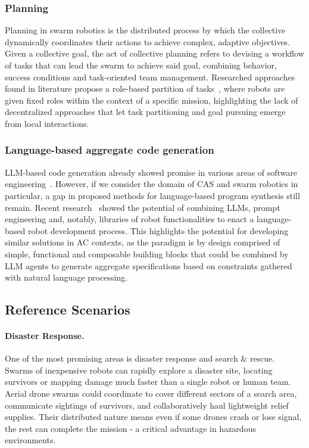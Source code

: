 \documentclass[12pt]{article}
\begin{document}
\subsubsection{Planning}
Planning in swarm robotics is the distributed process by which the collective dynamically coordinates their actions to achieve complex, adaptive objectives.
Given a collective goal, the act of collective planning refers to devising a workflow of tasks that can lead the swarm to achieve said goal, combining behavior, success conditions and task-oriented team management.
Researched approaches found in literature propose a role-based partition of tasks~\cite{sampedro2016flexible}, where robots are given fixed roles within the context of a specific mission, highlighting the lack
of decentralized approaches that let task partitioning and goal pursuing emerge from local interactions.

\subsubsection{Language-based aggregate code generation}
LLM-based code generation already showed promise in various areas of software engineering~\cite{hudson2024software,zhou2025large,he2025llm}. However, if we consider the domain of CAS and swarm robotics in particular, 
a gap in proposed methods for language-based program synthesis still remain. Recent research~\cite{vemprala2024chatgpt} showed the potential of combining LLMs, prompt engineering and, notably, libraries of robot functionalities 
to enact a language-based robot development process. This highlights the potential for developing similar solutions in AC contexts, as the paradigm is by design comprised of simple, functional and composable building blocks that could
be combined by LLM agents to generate aggregate specifications based on constraints gathered with natural language processing.

\subsection{Reference Scenarios}
\label{sec:scenarios}

\paragraph{Disaster Response.} One of the most promising areas is disaster response and search \& rescue. Swarms of inexpensive robots can rapidly explore a disaster site, 
locating survivors or mapping damage much faster than a single robot or human team. 
Aerial drone swarms could coordinate to cover different sectors of a search area, communicate sightings of survivors, and collaboratively haul lightweight relief supplies. 
Their distributed nature means even if some drones crash or lose signal, the rest can complete the mission - a critical advantage in hazardous environments.
\end{document}
